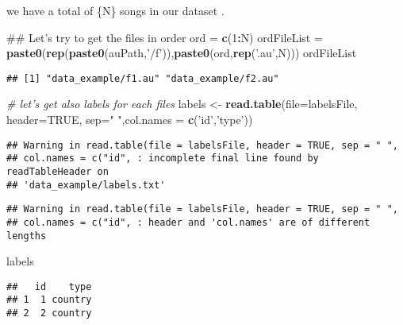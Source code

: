 \documentclass[]{article}
\newenvironment{Shaded}{\begin{snugshade}}{\end{snugshade}}
\newcommand{\KeywordTok}[1]{\textcolor[rgb]{0.13,0.29,0.53}{\textbf{#1}}}
\newcommand{\DataTypeTok}[1]{\textcolor[rgb]{0.13,0.29,0.53}{#1}}
\newcommand{\DecValTok}[1]{\textcolor[rgb]{0.00,0.00,0.81}{#1}}
\newcommand{\StringTok}[1]{\textcolor[rgb]{0.31,0.60,0.02}{#1}}
\newcommand{\CommentTok}[1]{\textcolor[rgb]{0.56,0.35,0.01}{\textit{#1}}}
\newcommand{\OtherTok}[1]{\textcolor[rgb]{0.56,0.35,0.01}{#1}}
\newcommand{\OperatorTok}[1]{\textcolor[rgb]{0.81,0.36,0.00}{\textbf{#1}}}
\newcommand{\NormalTok}[1]{#1}
\begin{document}
we have a total of \{N\} songs in our dataset .

\begin{Shaded}
\begin{Highlighting}[]
\NormalTok{## Let's try to get the files in order }
\NormalTok{ord =}\StringTok{ }\KeywordTok{c}\NormalTok{(}\DecValTok{1}\OperatorTok{:}\NormalTok{N)}
\NormalTok{ordFileList =}\StringTok{ }\KeywordTok{paste0}\NormalTok{(}\KeywordTok{rep}\NormalTok{(}\KeywordTok{paste0}\NormalTok{(auPath,}\StringTok{'/f'}\NormalTok{)),}\KeywordTok{paste0}\NormalTok{(ord,}\KeywordTok{rep}\NormalTok{(}\StringTok{'.au'}\NormalTok{,N)))}
\NormalTok{ordFileList}
\end{Highlighting}
\end{Shaded}

\begin{verbatim}
## [1] "data_example/f1.au" "data_example/f2.au"
\end{verbatim}

\begin{Shaded}
\begin{Highlighting}[]
\CommentTok{# let's get also labels for each files}
\NormalTok{labels <-}\StringTok{ }\KeywordTok{read.table}\NormalTok{(}\DataTypeTok{file=}\NormalTok{labelsFile, }\DataTypeTok{header=}\OtherTok{TRUE}\NormalTok{, }\DataTypeTok{sep=}\StringTok{" "}\NormalTok{,}\DataTypeTok{col.names  =} \KeywordTok{c}\NormalTok{(}\StringTok{'id'}\NormalTok{,}\StringTok{'type'}\NormalTok{))}
\end{Highlighting}
\end{Shaded}

\begin{verbatim}
## Warning in read.table(file = labelsFile, header = TRUE, sep = " ",
## col.names = c("id", : incomplete final line found by readTableHeader on
## 'data_example/labels.txt'
\end{verbatim}

\begin{verbatim}
## Warning in read.table(file = labelsFile, header = TRUE, sep = " ",
## col.names = c("id", : header and 'col.names' are of different lengths
\end{verbatim}

\begin{Shaded}
\begin{Highlighting}[]
\NormalTok{labels}
\end{Highlighting}
\end{Shaded}

\begin{verbatim}
##   id    type
## 1  1 country
## 2  2 country
\end{verbatim}
\end{document}

